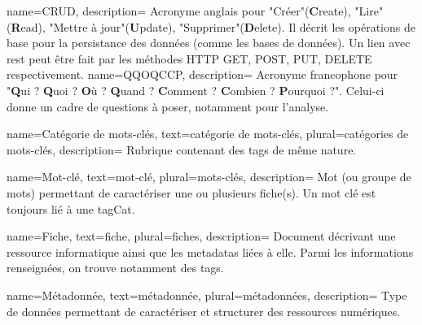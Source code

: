 {
    name={CRUD},
    description={
        Acronyme anglais pour "Créer"(\textbf{C}reate), "Lire" (\textbf{R}ead), "Mettre à jour"(\textbf{U}pdate), "Supprimer"(\textbf{D}elete). Il décrit les opérations de base pour la persistance des données (comme les bases de données). Un lien avec \Gls{rest} peut être fait par les méthodes HTTP GET, POST, PUT, DELETE respectivement.
    }
}
{
    name={QQOQCCP},
    description={
        Acronyme francophone pour "\textbf{Q}ui ? \textbf{Q}uoi ? \textbf{O}ù ? \textbf{Q}uand ? \textbf{C}omment ? \textbf{C}ombien ? \textbf{P}ourquoi ?". Celui-ci donne un cadre de questions à poser, notamment pour l'analyse.
    }
}

{
    name={Catégorie de mots-clés},
    text={catégorie de mots-clés},
    plural={catégories de mots-clés},
    description={
        Rubrique contenant des \glspl{tag} de même nature. 
    }
}

{
    name={Mot-clé},
    text={mot-clé},
    plural={mots-clés},
    description={
        Mot (ou groupe de mots) permettant de caractériser une ou plusieurs \gls{fiche}(s).
        Un mot clé est toujours lié à une \gls{tagCat}.
    }
}

{
    name={Fiche},
    text={fiche},
    plural={fiches},
    description={
        Document décrivant une ressource informatique ainsi que les \glspl{metadata} liées à elle. Parmi les informations renseignées, on trouve notamment des \glspl{tag}.
    }
}

{
    name={Métadonnée},
    text={métadonnée},
    plural={métadonnées},
    description={
        Type de données permettant de caractériser et structurer des ressources numériques.
    }
}